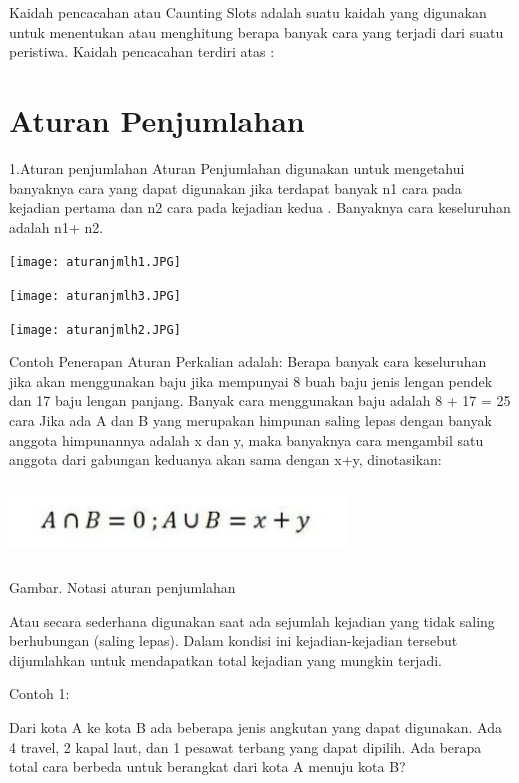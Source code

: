 \documentclass[11pt,fleqn]{book} %
\begin{document}
Kaidah pencacahan atau Caunting Slots adalah suatu kaidah yang digunakan untuk menentukan atau menghitung berapa banyak cara yang terjadi dari suatu peristiwa. Kaidah pencacahan terdiri atas :

\section{Aturan Penjumlahan}
1.Aturan penjumlahan
Aturan Penjumlahan digunakan untuk mengetahui banyaknya cara yang dapat digunakan jika terdapat banyak n1 cara pada kejadian pertama dan n2 cara pada kejadian kedua . Banyaknya
cara keseluruhan adalah n1+ n2.

\begin{center}
\texttt{[image: aturanjmlh1.JPG]}
\end{center}

\begin{center}
\texttt{[image: aturanjmlh3.JPG]}
\end{center}

\begin{center}
\texttt{[image: aturanjmlh2.JPG]}
\end{center}
Contoh Penerapan Aturan Perkalian adalah:
Berapa banyak cara keseluruhan jika akan menggunakan baju jika mempunyai 8 buah baju jenis
lengan pendek dan 17 baju lengan panjang.
Banyak cara menggunakan baju adalah 8 + 17 = 25 cara
 Jika ada A dan B yang merupakan himpunan saling lepas dengan banyak anggota himpunannya adalah x dan y, maka banyaknya cara mengambil satu anggota dari gabungan keduanya akan sama dengan x+y, dinotasikan:
 
 \includegraphics[width = 9cm, height= 2cm]{Pictures/notasijumlah.JPG}
 
 
 Gambar. Notasi aturan penjumlahan
 
 Atau secara sederhana digunakan saat ada sejumlah kejadian yang tidak saling berhubungan (saling lepas). Dalam kondisi ini kejadian-kejadian tersebut dijumlahkan untuk mendapatkan total kejadian yang mungkin terjadi.

Contoh 1:

Dari kota A ke kota B ada beberapa jenis angkutan yang dapat digunakan. Ada 4 travel, 2 kapal laut, dan 1 pesawat terbang yang dapat dipilih. Ada berapa total cara berbeda untuk berangkat dari kota A menuju kota B?
\end{document}
